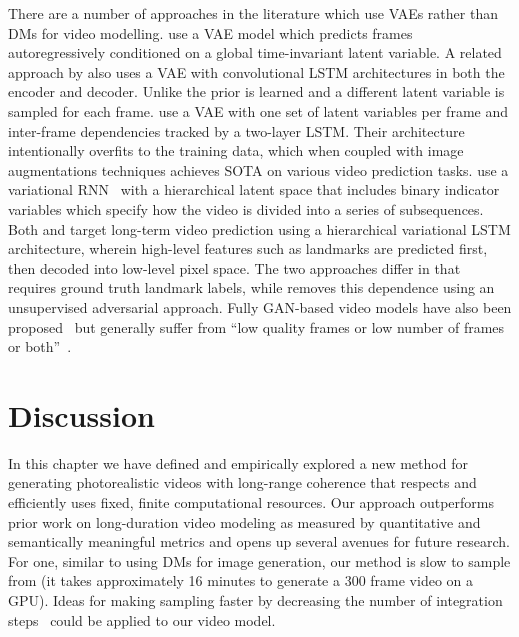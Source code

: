 There are a number of approaches in the literature which use VAEs rather than DMs for video modelling. \citet{babaeizadeh2017stochastic} use a VAE model which predicts frames autoregressively conditioned on a global time-invariant latent variable. A related approach by \citet{denton2018stochastic} also uses a VAE with convolutional LSTM architectures in both the encoder and decoder. Unlike \citet{babaeizadeh2017stochastic} the prior is learned and a different latent variable is sampled for each frame. \citet{babaeizadeh2021fitvid} use a VAE with one set of latent variables per frame and inter-frame dependencies tracked by a two-layer LSTM. Their architecture intentionally overfits to the training data, which when coupled with image augmentations techniques achieves SOTA on various video prediction tasks.  \citet{kim2019variational} use a variational RNN~\citep{chung2015recurrent} with a hierarchical latent space that includes binary indicator variables which specify how the video is divided into a series of subsequences. Both \citet{villegas2018hierarchical} and \citet{wichers2018learning} target long-term video prediction using a hierarchical variational LSTM architecture, wherein high-level features such as landmarks are predicted first, then decoded into low-level pixel space. The two approaches differ in that \citet{villegas2018hierarchical} requires ground truth landmark labels, while \cite{wichers2018learning} removes this dependence using an unsupervised adversarial approach. Fully GAN-based video models have also been proposed~\citep{aldausari2022video,clark2019adversarial} but generally suffer from ``low quality frames or low number of frames or both''~\citep{aldausari2022video}.

\section{Discussion}

In this chapter we have defined and empirically explored a new method for generating photorealistic videos with long-range coherence that respects and efficiently uses fixed, finite computational resources.
Our approach outperforms prior work on long-duration video modeling as measured by quantitative and semantically meaningful metrics and opens up several avenues for future research.
For one, similar to using DMs for image generation, our method is slow to sample from (it takes approximately 16 minutes to generate a 300 frame video on a GPU).  Ideas for making sampling faster by decreasing the number of integration steps~\citep{salimans2022progressive,song2020denoising,xiao2022tackling} could be applied to our video model.  

